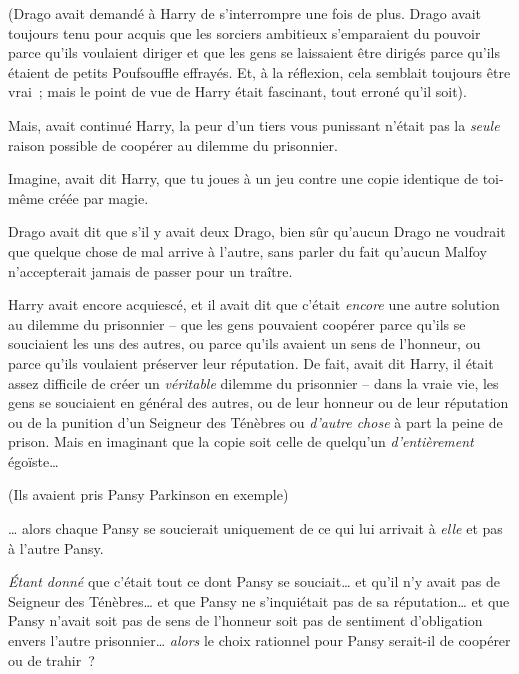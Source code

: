 (Drago avait demandé à Harry de s'interrompre une fois de plus.
Drago avait toujours tenu pour acquis que les sorciers ambitieux s'emparaient du pouvoir parce qu'ils voulaient diriger et que les gens se laissaient être dirigés parce qu'ils étaient de petits Poufsouffle effrayés.
Et, à la réflexion, cela semblait toujours être vrai~; mais le point de vue de Harry était fascinant, tout erroné qu'il soit).

Mais, avait continué Harry, la peur d'un tiers vous punissant n'était pas la \emph{seule} raison possible de coopérer au dilemme du prisonnier.

Imagine, avait dit Harry, que tu joues à un jeu contre une copie identique de toi-même créée par magie.

Drago avait dit que s'il y avait deux Drago, bien sûr qu'aucun Drago ne voudrait que quelque chose de mal arrive à l'autre, sans parler du fait qu'aucun Malfoy n'accepterait jamais de passer pour un traître.

Harry avait encore acquiescé, et il avait dit que c'était \emph{encore} une autre solution au dilemme du prisonnier -- que les gens pouvaient coopérer parce qu'ils se souciaient les uns des autres, ou parce qu'ils avaient un sens de l'honneur, ou parce qu'ils voulaient préserver leur réputation.
De fait, avait dit Harry, il était assez difficile de créer un \emph{véritable} dilemme du prisonnier -- dans la vraie vie, les gens se souciaient en général des autres, ou de leur honneur ou de leur réputation ou de la punition d'un Seigneur des Ténèbres ou \emph{d'autre chose} à part la peine de prison.
Mais en imaginant que la copie soit celle de quelqu'un \emph{d'entièrement} égoïste…

(Ils avaient pris Pansy Parkinson en exemple)

… alors chaque Pansy se soucierait uniquement de ce qui lui arrivait à \emph{elle} et pas à l'autre Pansy.

\emph{Étant donné} que c'était tout ce dont Pansy se souciait… et qu'il n'y avait pas de Seigneur des Ténèbres… et que Pansy ne s'inquiétait pas de sa réputation… et que Pansy n'avait soit pas de sens de l'honneur soit pas de sentiment d'obligation envers l'autre prisonnier…
\emph{alors} le choix rationnel pour Pansy serait-il de coopérer ou de trahir~?

